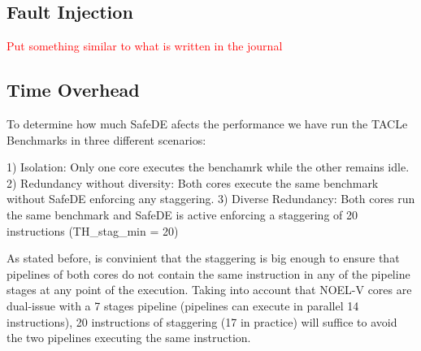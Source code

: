 \bigskip



\subsection{Fault Injection}
\textcolor{red}{Put something similar to what is written in the journal}
\bigskip



\subsection{Time Overhead}

To determine how much SafeDE afects the performance we have run the TACLe Benchmarks in three different scenarios:

1) Isolation: Only one core executes the benchamrk while the other remains idle.
2) Redundancy without diversity: Both cores execute the same benchmark without SafeDE enforcing any staggering. 
3) Diverse Redundancy: Both cores run the same benchmark and SafeDE is active enforcing a staggering of 20 instructions (TH\_stag\_min = 20)

As stated before, is convinient that the staggering is big enough to ensure that pipelines of both cores do not contain the same instruction in any of the pipeline stages at any point of the execution. Taking into account that NOEL-V cores are dual-issue with a 7 stages pipeline (pipelines can execute in parallel 14 instructions), 20 instructions of staggering (17 in practice) will suffice to avoid the two pipelines executing the same instruction. 



